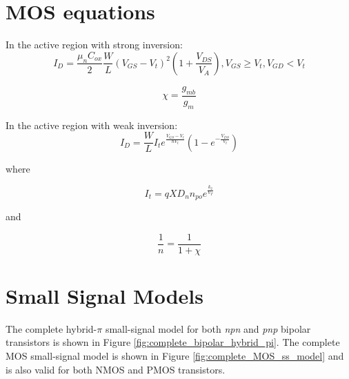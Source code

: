 \section*{MOS equations}

In the active region with strong inversion:
\begin{equation}
I_{D} = \frac{\mu_{n}C_{ox}}{2}\frac{W}{L}\left(V_{GS}-V_{t}\right)^{2}\left(1+\frac{V_{DS}}{V_{A}}\right), V_{GS} \geq V_{t}, V_{GD} < V_{t}
\label{eq:activeId}
\end{equation}

\begin{equation}
\chi = \frac{g_{mb}}{g_{m}}
\label{eq:chi}
\end{equation}

In the active region with weak inversion:
\begin{equation}
I_{D} = \frac{W}{L}I_{t}e^{\frac{V_{GS}-V_{t}}{nV_{t}}}\left(1-e^{-\frac{V_{DS}}{V_{t}}}\right)
\label{eq:Idweakinversion}
\end{equation}

\noindent where

\begin{equation}
I_{t} = qXD_{n}n_{po}e^{\frac{k_{2}}{V_{T}}}
\end{equation}

\noindent and

\begin{equation}
\frac{1}{n} = \frac{1}{1+\chi}
\label{eq:Id_n}
\end{equation}

\section*{Small Signal Models}
The complete hybrid-$\pi$ small-signal model \autocite[33]{analysis-design-analog-ics} for both \textit{npn} and \textit{pnp} bipolar transistors is shown in Figure \ref{fig:complete_bipolar_hybrid_pi}. The complete MOS small-signal model \autocite[55]{analysis-design-analog-ics} is shown in Figure \ref{fig:complete_MOS_ss_model} and is also valid for both NMOS and PMOS transistors.

